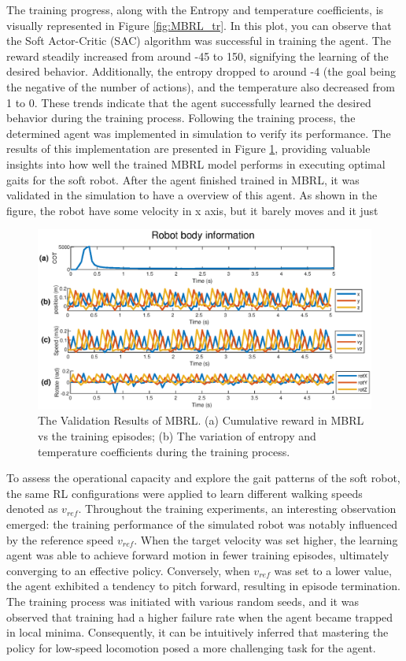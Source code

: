 The training progress, along with the Entropy and temperature coefficients, is visually represented in Figure \ref{fig:MBRL_tr}. In this plot, you can observe that the Soft Actor-Critic (SAC) algorithm was successful in training the agent. The reward steadily increased from around -45 to 150, signifying the learning of the desired behavior. Additionally, the entropy dropped to around -4 (the goal being the negative of the number of actions), and the temperature also decreased from 1 to 0. These trends indicate that the agent successfully learned the desired behavior during the training process. Following the training process, the determined agent was implemented in simulation to verify its performance. The results of this implementation are presented in Figure \ref{fig:MBRL_val}, providing valuable insights into how well the trained MBRL model performs in executing optimal gaits for the soft robot. After the agent finished trained in MBRL, it was validated in the simulation to have a overview of this agent. As shown in the figure, the robot have some velocity in x axis, but it barely moves and it just 
\begin{figure}[htb]
    \centering
    \includegraphics[width=\linewidth]{img/chap5/MBRL_val.eps}
    \caption{The Validation Results of MBRL. (a) Cumulative reward in MBRL vs the training episodes; (b) The variation of entropy and temperature coefficients during the training process.}
    \label{fig:MBRL_val}
\end{figure}

To assess the operational capacity and explore the gait patterns of the soft robot, the same RL configurations were applied to learn different walking speeds denoted as $v_{ref}$. Throughout the training experiments, an interesting observation emerged: the training performance of the simulated robot was notably influenced by the reference speed $v_{ref}$. When the target velocity was set higher, the learning agent was able to achieve forward motion in fewer training episodes, ultimately converging to an effective policy. Conversely, when $v_{ref}$ was set to a lower value, the agent exhibited a tendency to pitch forward, resulting in episode termination. The training process was initiated with various random seeds, and it was observed that training had a higher failure rate when the agent became trapped in local minima. Consequently, it can be intuitively inferred that mastering the policy for low-speed locomotion posed a more challenging task for the agent.

